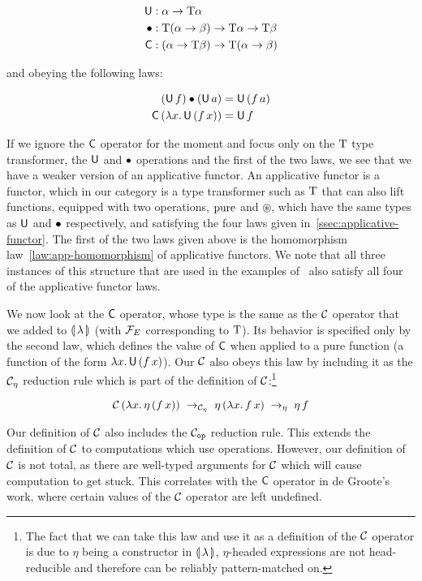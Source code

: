 \begin{align*}
  \textsf{U} &: \alpha \to \text{T} \alpha \\
  \mathbin{\bullet} &: \text{T}(\alpha \to \beta) \to \text{T} \alpha \to \text{T} \beta \\
  \textsf{C} &: (\alpha \to \text{T} \beta) \to \text{T} (\alpha \to \beta)
\end{align*}

and obeying the following laws:

\begin{align*}
  (\textsf{U}\,f) \mathbin{\bullet} (\textsf{U}\,a) &= \textsf{U}\,(f\,a) \\
  \textsf{C}\,(\lambda x.\, \textsf{U}\,(f\,x)) &= \textsf{U}\,f
\end{align*}

If we ignore the $\textsf{C}$ operator for the moment and focus only on the $\text{T}$
type transformer, the $\textsf{U}$ and $\mathbin{\bullet}$ operations and the first of the
two laws, we see that we have a weaker version of an applicative
functor. An applicative functor is a functor, which in our category is a
type transformer such as $\text{T}$ that can also lift functions, equipped with
two operations, $\operatorname{pure}$ and $\circledast$, which have the same types as
$\textsf{U}$ and $\mathbin{\bullet}$ respectively, and satisfying the four laws given
in~\ref{ssec:applicative-functor}. The first of the two laws given above is
the homomorphism law~\ref{law:app-homomorphism} of applicative functors. We
note that all three instances of this structure that are used in the
examples of~\cite{degroote2015conservativity} also satisfy all four of the
applicative functor laws.

We now look at the $\textsf{C}$ operator, whose type is the same as the $\mathcal{C}$
operator that we added to ${\llparenthesis \, \lambda \, \rrparenthesis}$ (with $\mathcal{F}_E$ corresponding to
$\text{T}$). Its behavior is specified only by the second law, which defines the
value of $\textsf{C}$ when applied to a pure function (a function of the form
$\lambda x.\, \textsf{U}\,(f\,x)$). Our $\mathcal{C}$ also obeys this law by
including it as the $\mathcal{C}_\eta$ reduction rule which is part of the
definition of $\mathcal{C}$:\footnote{The fact that we can take this law and use it
  as a definition of the $\mathcal{C}$ operator is due to $\eta$ being a
  constructor in ${\llparenthesis \, \lambda \, \rrparenthesis}$, $\eta$-headed expressions are not head-reducible
  and therefore can be reliably pattern-matched on.}

$$
\mathcal{C}\,(\lambda x.\, \eta\,(f\,x)) \; \to_{\mathcal{C}_\eta} \;
\eta\,(\lambda x.\, f\,x) \; \to_\eta \; \eta\,f
$$

Our definition of $\mathcal{C}$ also includes the $\mathcal{C}_{\mathtt{op}}$ reduction
rule. This extends the definition of $\mathcal{C}$ to computations which use
operations. However, our definition of $\mathcal{C}$ is not total, as there are
well-typed arguments for $\mathcal{C}$ which will cause computation to get
stuck. This correlates with the $\textsf{C}$ operator in de Groote's work, where
certain values of the $\mathcal{C}$ operator are left undefined.


